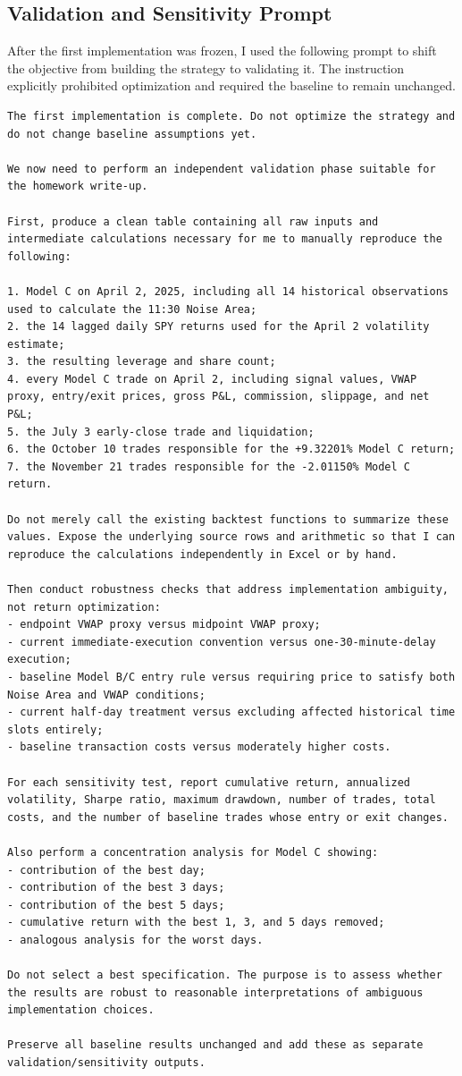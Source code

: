 \documentclass{article}
\begin{document}
\subsection{Validation and Sensitivity Prompt}

After the first implementation was frozen, I used the following prompt to shift the objective from building the strategy to validating it. The instruction explicitly prohibited optimization and required the baseline to remain unchanged.

\begin{lstlisting}
The first implementation is complete. Do not optimize the strategy and do not change baseline assumptions yet.

We now need to perform an independent validation phase suitable for the homework write-up.

First, produce a clean table containing all raw inputs and intermediate calculations necessary for me to manually reproduce the following:

1. Model C on April 2, 2025, including all 14 historical observations used to calculate the 11:30 Noise Area;
2. the 14 lagged daily SPY returns used for the April 2 volatility estimate;
3. the resulting leverage and share count;
4. every Model C trade on April 2, including signal values, VWAP proxy, entry/exit prices, gross P&L, commission, slippage, and net P&L;
5. the July 3 early-close trade and liquidation;
6. the October 10 trades responsible for the +9.32201% Model C return;
7. the November 21 trades responsible for the -2.01150% Model C return.

Do not merely call the existing backtest functions to summarize these values. Expose the underlying source rows and arithmetic so that I can reproduce the calculations independently in Excel or by hand.

Then conduct robustness checks that address implementation ambiguity, not return optimization:
- endpoint VWAP proxy versus midpoint VWAP proxy;
- current immediate-execution convention versus one-30-minute-delay execution;
- baseline Model B/C entry rule versus requiring price to satisfy both Noise Area and VWAP conditions;
- current half-day treatment versus excluding affected historical time slots entirely;
- baseline transaction costs versus moderately higher costs.

For each sensitivity test, report cumulative return, annualized volatility, Sharpe ratio, maximum drawdown, number of trades, total costs, and the number of baseline trades whose entry or exit changes.

Also perform a concentration analysis for Model C showing:
- contribution of the best day;
- contribution of the best 3 days;
- contribution of the best 5 days;
- cumulative return with the best 1, 3, and 5 days removed;
- analogous analysis for the worst days.

Do not select a best specification. The purpose is to assess whether the results are robust to reasonable interpretations of ambiguous implementation choices.

Preserve all baseline results unchanged and add these as separate validation/sensitivity outputs.
\end{lstlisting}
\end{document}
